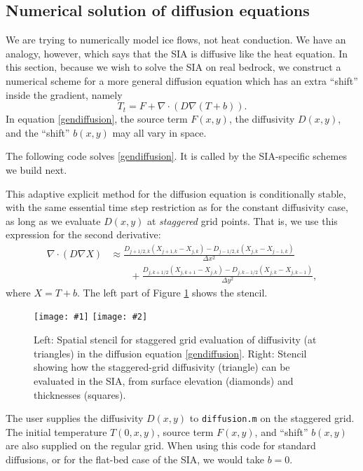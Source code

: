 \documentclass[letterpaper,final,12pt,reqno]{amsart}
\newcommand{\grad}{\nabla}
\newcommand{\Div}{\nabla\cdot}
\newcommand{\minput}[1]{
\vspace{0.8cm}
\VerbatimInput[frame=single,framesep=3mm,label=\fbox{\normalsize \textsl{\,#1.m\,}},fontfamily=courier,fontsize=\footnotesize]{tmp/#1.slim.m}
\vspace{0.5cm}
}
\newcommand{\twofigsizes}[5]{
\begin{figure}[ht]
\centering
\texttt{[image: \#1]} \quad
\texttt{[image: \#2]}
\caption{#3}
\label{fig:#1}
\end{figure}}
\begin{document}
\subsection*{Numerical solution of diffusion equations}  We are trying to numerically model ice flows, not heat conduction.  We have an analogy, however, which says that the SIA is diffusive like the heat equation.  In this section, because we wish to solve the SIA on real bedrock, we construct a numerical scheme for a more general diffusion equation which has an extra ``shift'' inside the gradient, namely
\begin{equation}
  T_t = F + \Div \left(D \grad (T + b)\right). \label{gendiffusion}
\end{equation}
In equation \eqref{gendiffusion}, the source term $F(x,y)$, the diffusivity $D(x,y)$, and the ``shift'' $b(x,y)$ may all vary in space.

The following code solves \eqref{gendiffusion}.  It is called by the SIA-specific schemes we build next.

\minput{diffusion}

This adaptive explicit method for the diffusion equation is conditionally stable, with the same essential time step restriction as for the constant diffusivity case, as long as we evaluate $D(x,y)$ at \emph{staggered} grid points.  That is, we use this expression for the second derivative:
\begin{align*}
\Div \left(D \grad X\right) &\approx \frac{D_{j+1/2,k}(X_{j+1,k} - X_{j,k}) - D_{j-1/2,k}(X_{j,k} - X_{j-1,k})}{\Delta x^2} \\
	&\qquad + \frac{D_{j,k+1/2}(X_{j,k+1} - X_{j,k}) - D_{j,k-1/2}(X_{j,k} - X_{j,k-1})}{\Delta y^2},
\end{align*}
where $X=T+b$.  The left part of Figure \ref{fig:diffstencil} shows the stencil.

\twofigsizes{diffstencil}{mahaffystencil}{Left:  Spatial stencil for staggered grid evaluation of diffusivity (at triangles) in the diffusion equation \eqref{gendiffusion}.  Right: Stencil showing how the staggered-grid diffusivity (triangle) can be evaluated in the SIA, from surface elevation (diamonds) and thicknesses (squares).}{2.2in}{2.2in}

The user supplies the diffusivity $D(x,y)$ to \texttt{diffusion.m} on the staggered grid.  The initial temperature $T(0,x,y)$, source term $F(x,y)$, and ``shift'' $b(x,y)$ are also supplied on the regular grid.  When using this code for standard diffusions, or for the flat-bed case of the SIA, we would take $b=0$.
\end{document}
